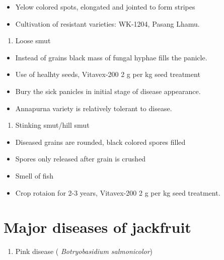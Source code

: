 \documentclass[
]{book}
\providecommand{\tightlist}{%
  \setlength{\itemsep}{0pt}\setlength{\parskip}{0pt}}
\begin{document}
\begin{itemize}
\tightlist
\item
  Yelow colored spots, elongated and jointed to form stripes
\item
  Cultivation of resistant varieties: WK-1204, Pasang Lhamu.
\end{itemize}

\begin{enumerate}
\def\labelenumi{\arabic{enumi}.}
\setcounter{enumi}{3}
\tightlist
\item
  Loose smut
\end{enumerate}

\begin{itemize}
\tightlist
\item
  Instead of grains black mass of fungal hyphae fills the panicle.
\item
  Use of healhty seeds, Vitavex-200 2 g per kg seed treatment
\item
  Bury the sick panicles in initial stage of disease appearance.
\item
  Annapurna variety is relatively tolerant to disease.
\end{itemize}

\begin{enumerate}
\def\labelenumi{\arabic{enumi}.}
\setcounter{enumi}{4}
\tightlist
\item
  Stinking smut/hill smut
\end{enumerate}

\begin{itemize}
\tightlist
\item
  Diseased grains are rounded, black colored spores filled
\item
  Spores only released after grain is crushed
\item
  Smell of fish
\item
  Crop rotaion for 2-3 years, Vitavex-200 2 g per kg seed treatment.
\end{itemize}

\hypertarget{major-diseases-of-jackfruit}{%
\section{Major diseases of jackfruit}\label{major-diseases-of-jackfruit}}

\begin{enumerate}
\def\labelenumi{\arabic{enumi}.}
\tightlist
\item
  Pink disease ( \emph{Botryobasidium salmonicolor})
\end{enumerate}
\end{document}
